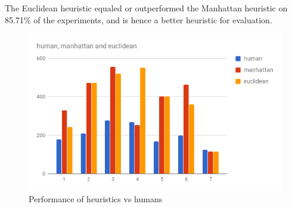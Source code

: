 The Euclidean heuristic equaled or outperformed the Manhattan heuristic on 85.71\% of the experiments, and is hence a better heuristic for evaluation.


\begin{figure}
  \includegraphics[width=\linewidth]{images/chart.png}
  \caption{Performance of heuristics vs humans}
  \label{fig:chart1}
\end{figure}